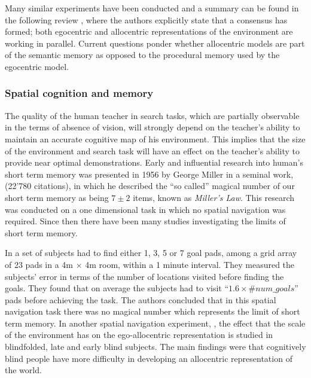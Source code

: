 Many similar experiments have been conducted and a summary can be found in the following review \cite{spatial_memory_how_ego_allo_combine_2006},
where the authors explicitly state that a consensus has formed; both egocentric and allocentric representations of the environment are 
working in parallel. Current questions ponder whether allocentric models are part of the semantic memory as opposed to the procedural 
memory used by the egocentric model.

\subsubsection{Spatial cognition and memory}

The quality of the human teacher in  search tasks, which are partially observable in the terms of absence of vision,
will strongly depend on the teacher's ability to maintain an accurate cognitive map of his environment. This implies
that the size of the environment and search task will have an effect on the teacher's ability to provide near optimal 
demonstrations. 
Early and influential research into human's short term memory was presented in 1956 by George Miller in a seminal work, \cite{cogprints730} 
(22'780 citations), in which he described the ``so called'' magical number of our short term memory as being $7\pm2$ items, 
known as \textit{Miller's Law}. This research was conducted on a one dimensional task in which no spatial navigation was required.
Since then there have been many studies investigating the limits of short term memory.

In \cite{human_stsm_2015} a set of subjects had to find either 1, 3, 5 or 7 goal pads, among a grid array of 23 pads in a 4m $\times$ 4m room, 
within a 1 minute interval. They measured the subjects' error in terms of the number of locations visited before finding the goals. 
They found that on average the subjects had to visit ``$1.6 \times \#num\_goals$'' pads before achieving the task. The authors concluded 
that in this spatial navigation task there was no magical number which represents the limit of short term memory.
In another spatial navigation experiment, \cite{Iachini2014}, the effect that the scale of the environment 
has on the ego-allocentric representation is studied in blindfolded, late and early blind subjects. The main findings were
that cognitively blind people have more difficulty in developing an allocentric representation of the world. 

